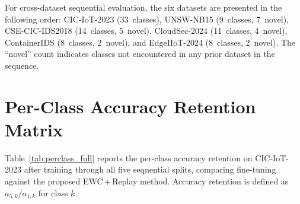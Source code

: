 \documentclass[journal]{IEEEtran}
\begin{document}
For cross-dataset sequential evaluation, the six datasets are presented in the following order: CIC-IoT-2023 (33~classes), UNSW-NB15 (9~classes, 7~novel), CSE-CIC-IDS2018 (14~classes, 5~novel), CloudSec-2024 (11~classes, 4~novel), ContainerIDS (8~classes, 2~novel), and EdgeIIoT-2024 (8~classes, 2~novel). The ``novel'' count indicates classes not encountered in any prior dataset in the sequence.

\section{Per-Class Accuracy Retention Matrix}

Table~\ref{tab:perclass_full} reports the per-class accuracy retention on CIC-IoT-2023 after training through all five sequential splits, comparing fine-tuning against the proposed EWC\,+\,Replay method. Accuracy retention is defined as $a_{5,k} / a_{1,k}$ for class $k$.
\end{document}
